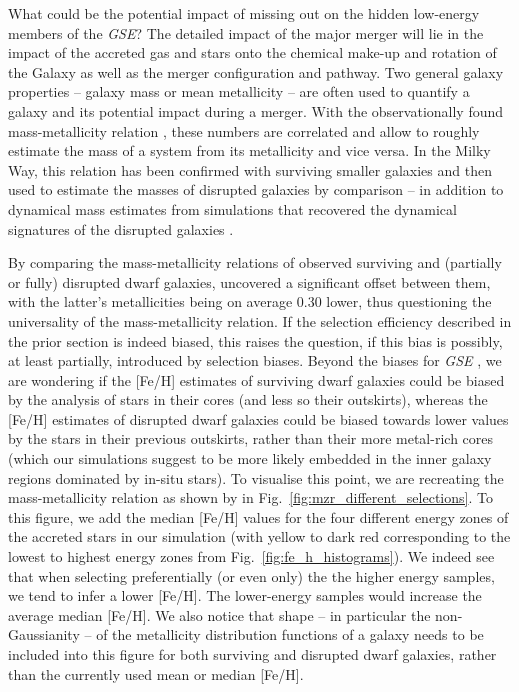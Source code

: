 \documentclass[fleqn,usenatbib]{mnras}
\begin{document}
What could be the potential impact of missing out on the hidden low-energy members of the \textit{GSE}? The detailed impact of the major merger will lie in the impact of the accreted gas and stars onto the chemical make-up and rotation of the Galaxy as well as the merger configuration and pathway. Two general galaxy properties -- galaxy mass or mean metallicity -- are often used to quantify a galaxy and its potential impact during a merger. With the observationally found mass-metallicity relation \citep[for example][]{Gallazzi2005, Kirby2013}, these numbers are correlated and allow to roughly estimate the mass of a system from its metallicity and vice versa. In the Milky Way, this relation has been confirmed with surviving smaller galaxies \citep{Kirby2013} and then used to estimate the masses of disrupted galaxies by comparison \citep[for example][]{Helmi2018} -- in addition to dynamical mass estimates from simulations that recovered the dynamical signatures of the disrupted galaxies \citep[for example][]{Naidu2022b}.

By comparing the mass-metallicity relations of observed surviving and (partially or fully) disrupted dwarf galaxies, \citet{Naidu2022b} uncovered a significant offset between them, with the latter's metallicities being on average 0.30 lower, thus questioning the universality of the mass-metallicity relation. If the selection efficiency described in the prior section is indeed biased, this raises the question, if this bias is possibly, at least partially, introduced by selection biases. Beyond the biases for \textit{GSE} \citep{Skuladottir2025}, we are wondering if the [Fe/H] estimates of surviving dwarf galaxies could be biased by the analysis of stars in their cores (and less so their outskirts), whereas the [Fe/H] estimates of disrupted dwarf galaxies could be biased towards lower values by the stars in their previous outskirts, rather than their more metal-rich cores (which our simulations suggest to be more likely embedded in the inner galaxy regions dominated by in-situ stars). To visualise this point, we are recreating the mass-metallicity relation as shown by \citet{Naidu2022b} in Fig.~\ref{fig:mzr_different_selections}. To this figure, we add the median [Fe/H] values for the four different energy zones of the accreted stars in our simulation (with yellow to dark red corresponding to the lowest to highest energy zones from Fig.~\ref{fig:fe_h_histograms}). We indeed see that when selecting preferentially (or even only) the the higher energy samples, we tend to infer a lower [Fe/H]. The lower-energy samples would increase the average median [Fe/H]. We also notice that shape -- in particular the non-Gaussianity -- of the metallicity distribution functions of a galaxy needs to be included into this figure for both surviving and disrupted dwarf galaxies, rather than the currently used mean or median [Fe/H].
\end{document}
